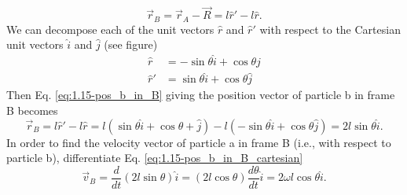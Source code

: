 \documentclass{esg8012pset}
\begin{document}
\begin{solution}
\begin{enumerate}[a.]
      \begin{equation} \vec r_B = \vec r_A - \vec R = l\hat r' - l\hat r. \label{eq:1.15-pos_b_in_B} \end{equation}
      We can decompose each of the unit vectors $\hat r$ and $\hat r'$ with respect to the Cartesian unit vectors $\hat i$ and $\hat j$ (see figure)
      \begin{align}
        \hat r & = -\sin\theta \hat i + \cos\theta \hat j \label{eq:1.15-cartesian_r_hat} \\
        \hat r' & = \sin\theta \hat i + \cos\theta \hat j \label{eq:1.15-cartesian_r_hat'}
      \end{align}
      Then Eq. \ref{eq:1.15-pos_b_in_B} giving the position vector of particle b in frame B becomes
      \begin{equation}
        \vec r_B = l\hat r' - l\hat r = l(\sin\theta \hat i + \cos\theta + \hat j) - l(-\sin\theta \hat i + \cos\theta \hat j) = 2l\sin\theta \hat i. \label{eq:1.15-pos_b_in_B_cartesian}
      \end{equation}
      In order to find the velocity vector of particle a in frame B (i.e., with respect to particle b), differentiate Eq. \ref{eq:1.15-pos_b_in_B_cartesian}
      \begin{equation}
        \vec v_B = \frac{d}{dt}(2l\sin\theta) \hat i = (2l\cos\theta)\frac{d\theta}{dt}\hat i = 2\omega l \cos\theta \hat i.
      \end{equation}
  \end{enumerate}
\end{solution}
\end{document}
